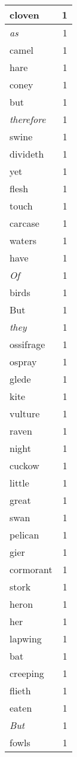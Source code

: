 \begin{center}
\begin{longtable}{l|r}
cloven & 1 \\ \hline
\emph{as} & 1 \\ \hline
camel & 1 \\ \hline
hare & 1 \\ \hline
coney & 1 \\ \hline
but & 1 \\ \hline
\emph{therefore} & 1 \\ \hline
swine & 1 \\ \hline
divideth & 1 \\ \hline
yet & 1 \\ \hline
flesh & 1 \\ \hline
touch & 1 \\ \hline
carcase & 1 \\ \hline
waters & 1 \\ \hline
have & 1 \\ \hline
\emph{Of} & 1 \\ \hline
birds & 1 \\ \hline
But & 1 \\ \hline
\emph{they} & 1 \\ \hline
ossifrage & 1 \\ \hline
ospray & 1 \\ \hline
glede & 1 \\ \hline
kite & 1 \\ \hline
vulture & 1 \\ \hline
raven & 1 \\ \hline
night & 1 \\ \hline
cuckow & 1 \\ \hline
little & 1 \\ \hline
great & 1 \\ \hline
swan & 1 \\ \hline
pelican & 1 \\ \hline
gier & 1 \\ \hline
cormorant & 1 \\ \hline
stork & 1 \\ \hline
heron & 1 \\ \hline
her & 1 \\ \hline
lapwing & 1 \\ \hline
bat & 1 \\ \hline
creeping & 1 \\ \hline
flieth & 1 \\ \hline
eaten & 1 \\ \hline
\emph{But} & 1 \\ \hline
fowls & 1 \\ \hline

\end{longtable}
\end{center}

